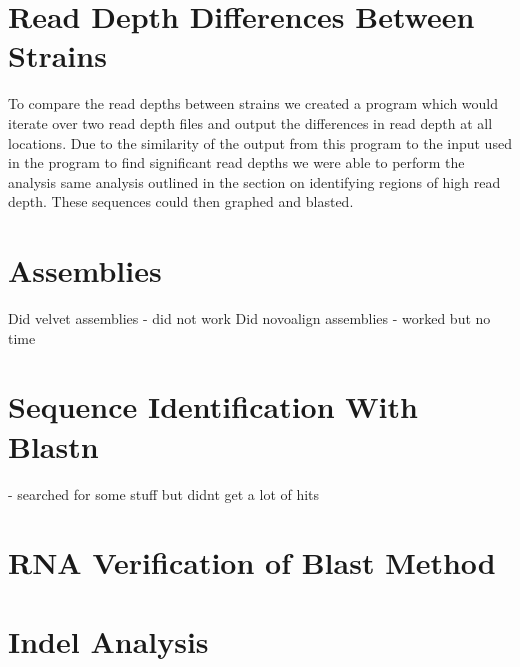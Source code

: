 \documentclass[12pt]{article}
\begin{document}
%
%
\section{Read Depth Differences Between Strains}
	To compare the read depths between strains we created a program which would iterate over two read depth files and output the differences in read depth at all locations. Due to the similarity of the output from this program to the input used in the program to find significant read depths we were able to perform the analysis same analysis outlined in the section on identifying regions of high read depth. These sequences could then graphed and blasted.

%
%
\section{Assemblies}
	Did velvet assemblies - did not work
	Did novoalign assemblies - worked but no time
%
%
\section{Sequence Identification With Blastn}
	- searched for some stuff but didnt get a lot of hits	

%
%
\section{RNA Verification of Blast Method}

%
%
\section{Indel Analysis}


%
%
\end{document}
